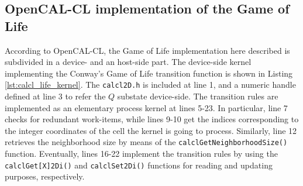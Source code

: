 \subsection{OpenCAL-CL implementation of the Game of Life}
According to OpenCAL-CL, the Game of Life implementation here
described is subdivided in a device- and an host-side part. The
device-side kernel implementing the Conway's Game of Life
transition function is shown in Listing
\ref{lst:calcl_life_kernel}. The \verb'calcl2D.h' is included at
line 1, and a numeric handle defined at line 3 to refer the $Q$
substate device-side. The transition rules are implemented as an
elementary process kernel at lines 5-23. In particular, line 7
checks for redundant work-items, while lines 9-10 get the
indices corresponding to the integer coordinates of the cell the
kernel is going to process. Similarly, line 12 retrieves the
neighborhood size by means of the
\verb'calclGetNeighborhoodSize()' function. Eventually, lines
16-22 implement the transition rules by using the
\verb'calclGet[X]2Di()' and \verb'calclSet2Di()' functions for
reading and updating purposes, respectively.



